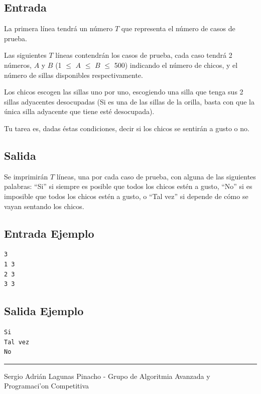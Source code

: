 \documentclass[letter,10pt]{article}
\newcommand{\lyxaddress}[1]{
\par {\raggedright #1
\vspace{1.4em}
\noindent\par}
}
\begin{document}
\subsection*{Entrada}

La primera línea tendrá un número $T$ que representa el número de casos de prueba.

Las siguientes $T$ líneas contendrán los casos de prueba, cada caso tendrá 2 números, $A$ y $B$ (1 $\leq$ $A$ $\leq$ $B$ $\leq$ 500) indicando el número de chicos, y el número de sillas disponibles respectivamente.

Los chicos escogen las sillas uno por uno, escogiendo una silla que tenga sus 2 sillas adyacentes desocupadas (Si es una de las sillas de la orilla, basta con que la única silla adyacente que tiene esté desocupada).

Tu tarea es, dadas éstas condiciones, decir si los chicos se sentirán a gusto o no.


\subsection*{Salida}

Se imprimirán $T$ líneas, una por cada caso de prueba, con alguna de las siguientes palabras: ``Si'' si siempre es posible que todos los chicos estén a gusto, ``No'' si es imposible que todos los chicos estén a gusto, o ``Tal vez'' si depende de cómo se vayan sentando los chicos.



\subsection*{Entrada Ejemplo}
\begin{verbatim}
3
1 3
2 3
3 3
\end{verbatim}

\subsection*{Salida Ejemplo}

\begin{verbatim}
Si
Tal vez
No

\end{verbatim}

\noindent \rule[0.5ex]{1\columnwidth}{1pt}


\lyxaddress{Sergio Adrián Lagunas Pinacho - Grupo de Algoritmia Avanzada y Programaci'on Competitiva}
\end{document}
